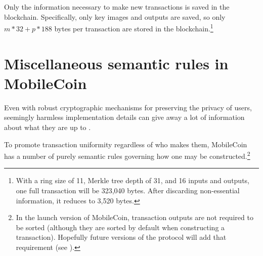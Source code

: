 Only the information necessary to make new transactions is saved in the blockchain. Specifically, only key images and outputs are saved, so only $m*32 + p*188$ bytes per transaction are stored in the blockchain.\footnote{With a ring size of 11, Merkle tree depth of 31, and 16 inputs and outputs, one full transaction will be 323,040 bytes. After discarding non-essential information, it reduces to 3,520 bytes.}

\section{Miscellaneous semantic rules in MobileCoin}
\label{sec:misc-semantic-rules}

Even with robust cryptographic mechanisms for preserving the privacy of users, seemingly harmless implementation details can give away a lot of information about what they are up to \cite{monero-tx-extra-statistics,update-tx-supplement-proposal-monero}.

To promote transaction uniformity regardless of who makes them, MobileCoin has a number of purely semantic rules governing how one may be constructed.\footnote{In the launch version of MobileCoin, transaction outputs are not required to be sorted (although they are sorted by default when constructing a transaction). Hopefully future versions of the protocol will add that requirement (see \cite{mc-pull-request-validate-sorted-outputs-in-tx}).}

